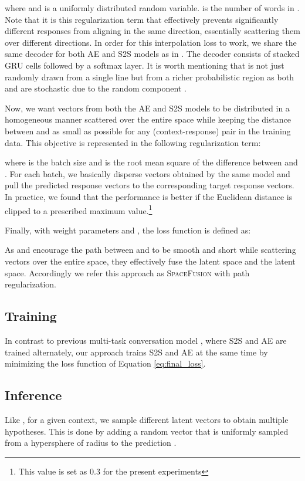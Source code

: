 \documentclass[11pt,a4paper]{article}
\begin{document}
where  and  is a uniformly distributed random variable.  is the number of words in . Note that it is this regularization term that effectively prevents significantly different responses from aligning in the same direction, essentially scattering them over different directions.
In order for this interpolation loss to work, we share the same decoder for both AE and S2S models as in \cite{luan2017mtask}. The decoder consists of stacked GRU cells followed by a softmax layer. 
It is worth mentioning that  is not just randomly drawn from a single line but from a richer probabilistic region as both  and  are stochastic due to the random component .

Now, we want vectors from both the AE and S2S models to be distributed in a homogeneous manner scattered over the entire space while keeping the distance between  and  as small as possible for any (context-response) pair in the training data. This objective is represented in the following regularization term:

where  is the batch size and  is the root mean square of the difference between  and . For each batch, we basically disperse vectors obtained by the same model and pull the predicted response vectors to the corresponding target response vectors.
In practice, we found that the performance is better if the Euclidean distance is clipped to a prescribed maximum value.\footnote{This value is set as 0.3 for the present experiments}

Finally, with weight parameters  and , the loss function is defined as: 

As  and  encourage the path between  and  to be smooth and short while scattering vectors over the entire space, they effectively fuse the  latent space and the  latent space. Accordingly we refer this approach as \textsc{SpaceFusion} with path regularization.

\subsection{Training}
In contrast to previous multi-task conversation model \cite{luan2017mtask}, where S2S and AE are trained alternately, our approach trains S2S and AE at the same time by minimizing the loss function of Equation \ref{eq:final_loss}.

\subsection{Inference}
Like \citet{zhao2017cvae, bowman2016vae}, for a given context, we sample different latent vectors to obtain multiple hypotheses. This is done by adding a random vector  that is uniformly sampled from a hypersphere of radius  to the prediction .
\end{document}
